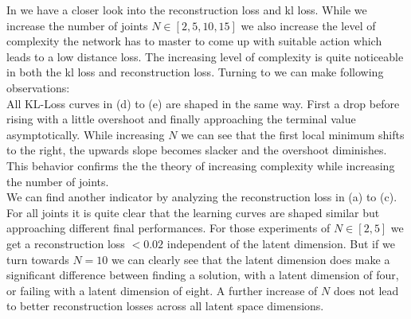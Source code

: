 In  we have a closer look into the reconstruction loss and kl loss. While we increase the number of joints $N \in [2, 5, 10, 15]$ we also increase the level of complexity the network has to master to come up with suitable action which leads to a low distance loss. The increasing level of complexity is quite noticeable in both the kl loss and reconstruction loss. Turning to  we can make following observations:\\
All KL-Loss curves in  (d) to (e) are shaped in the same way. First a drop before rising with a little overshoot and finally approaching the terminal value asymptotically. While increasing $N$ we can see that the first local minimum shifts to the right, the upwards slope becomes slacker and the overshoot diminishes. This behavior confirms the the theory of increasing complexity while increasing the number of joints.\\
We can find another indicator by analyzing the reconstruction loss in  (a) to (c). For all joints it is quite clear that the learning curves are shaped similar but approaching different final performances. For those experiments of $N \in [2, 5]$ we get a reconstruction loss $< 0.02$ independent of the latent dimension. But if we turn towards $N = 10$ we can clearly see that the latent dimension does make a significant difference between finding a solution, with a latent dimension of four, or failing with a latent dimension of eight. A further increase of $N$ does not lead to better reconstruction losses across all latent space dimensions. 
